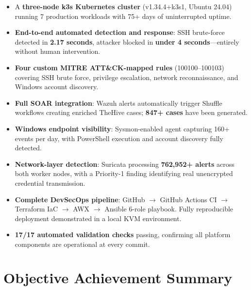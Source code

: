 \documentclass[12pt,a4paper]{report}
\begin{document}
\begin{itemize}
  \item A \textbf{three-node k3s Kubernetes cluster} (v1.34.4+k3s1, Ubuntu 24.04) running 7 production workloads with 75+ days of uninterrupted uptime.
  \item \textbf{End-to-end automated detection and response}: SSH brute-force detected in \textbf{2.17 seconds}, attacker blocked in \textbf{under 4 seconds}---entirely without human intervention.
  \item \textbf{Four custom MITRE ATT\&CK-mapped rules} (100100--100103) covering SSH brute force, privilege escalation, network reconnaissance, and Windows account discovery.
  \item \textbf{Full SOAR integration}: Wazuh alerts automatically trigger Shuffle workflows creating enriched TheHive cases; \textbf{847+ cases} have been generated.
  \item \textbf{Windows endpoint visibility}: Sysmon-enabled agent capturing 160+ events per day, with PowerShell execution and account discovery fully detected.
  \item \textbf{Network-layer detection}: Suricata processing \textbf{762,952+ alerts} across both worker nodes, with a Priority-1 finding identifying real unencrypted credential transmission.
  \item \textbf{Complete DevSecOps pipeline}: GitHub $\rightarrow$ GitHub Actions CI $\rightarrow$ Terraform IaC $\rightarrow$ AWX $\rightarrow$ Ansible 6-role playbook. Fully reproducible deployment demonstrated in a local KVM environment.
  \item \textbf{17/17 automated validation checks} passing, confirming all platform components are operational at every commit.
\end{itemize}

\section*{Objective Achievement Summary}
\end{document}
